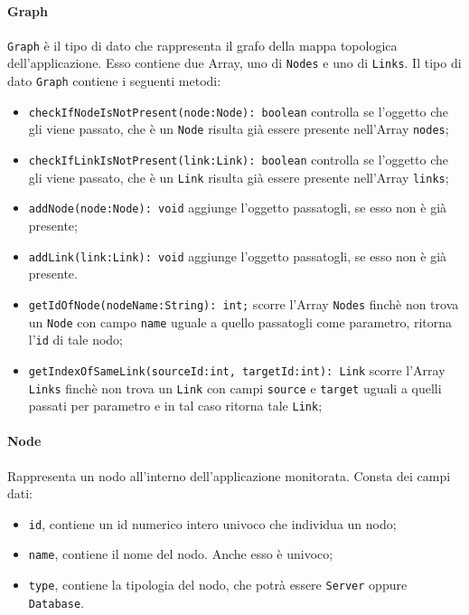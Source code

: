 \paragraph{Graph} \Spazio
\label{sec:Graph}
	\texttt{Graph} è il tipo di dato che rappresenta il grafo della mappa topologica dell'applicazione. Esso contiene due Array, uno di \texttt{Nodes} e uno di \texttt{Links}.
	Il tipo di dato \texttt{Graph} contiene i seguenti metodi:
	\begin{itemize}
		\item{\texttt{checkIfNodeIsNotPresent(node:Node): boolean} controlla se l'oggetto che gli viene passato, che è  un \texttt{Node} risulta già essere presente nell'Array \texttt{nodes}; }
		\item{\texttt{checkIfLinkIsNotPresent(link:Link): boolean} controlla se l'oggetto che gli viene passato, che è un \texttt{Link} risulta già essere presente nell'Array \texttt{links}; }
		\item{\texttt{addNode(node:Node): void} aggiunge l'oggetto passatogli, se esso non è già presente;}
		\item{\texttt{addLink(link:Link): void} aggiunge l'oggetto passatogli, se esso non è già presente.}	

		\item{\texttt{getIdOfNode(nodeName:String): int;} scorre l'Array \texttt{Nodes} finchè non trova un \texttt{Node} con campo \texttt{name} uguale a quello passatogli come parametro, ritorna l'\texttt{id} di tale nodo; }
		\item{\texttt{getIndexOfSameLink(sourceId:int, targetId:int): Link} scorre l'Array \texttt{Links} finchè non trova un \texttt{Link} con campi \texttt{source} e \texttt{target} uguali a quelli passati per parametro e in tal caso ritorna tale \texttt{Link};}				
	\end{itemize}

\paragraph{Node} \Spazio
Rappresenta un nodo all'interno dell'applicazione monitorata. Consta dei campi dati: 
\begin{itemize}
	\item \texttt{id}, contiene un id numerico intero univoco che individua un nodo;
	\item \texttt{name}, contiene il nome del nodo. Anche esso è univoco;
	\item \texttt{type}, contiene la tipologia del nodo, che potrà essere \texttt{Server} oppure \texttt{Database}.
\end{itemize}

